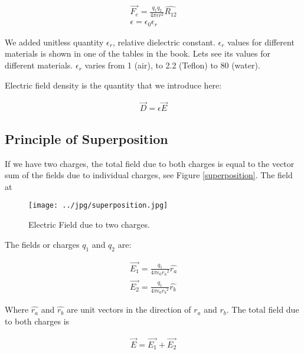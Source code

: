 \begin{eqnarray}
\vec{F_e}=\frac{q_1 q_2}{4 \pi \epsilon r^2} \hat{R_{12}} \\
\epsilon = \epsilon_0 \epsilon_r
\end{eqnarray}\label{Coulombslaw3}

We added unitless quantity $\epsilon_r$, relative dielectric constant. $\epsilon_r$ values for different materials is shown in one of the tables in the book. Lets see its values for different materials. $\epsilon_r$ varies from 1 (air), to 2.2 (Teflon) to 80 (water). 

Electric field density is the quantity that we introduce here:

\begin{eqnarray}
\vec{D}= \epsilon \vec{E}
\end{eqnarray}


\subsection{Principle of Superposition}

If we have two charges, the total field due to both charges is equal to the vector sum of the fields due to individual charges, see Figure \ref{superposition}.  The field at



\begin{figure}[htbp]
\begin{center}
\texttt{[image: ../jpg/superposition.jpg]}
\end{center}
\caption{Electric Field due to two charges.}
\label{UnitCh}
\end{figure}

The fields or charges $q_1$ and $q_2$ are:

\begin{eqnarray}
\vec{E_1}=\frac{q_1}{4 \pi \epsilon_{0} {r_a}^2} \hat{r_a} \label{field}\\
\vec{E_2}=\frac{q_1}{4 \pi \epsilon_{0} {r_b}^2} \hat{r_b}
\end{eqnarray}

Where $\hat{r_a}$ and $\hat{r_b}$ are unit vectors in the direction of $r_a$ and $r_b$. The total field due to both charges is


\begin{eqnarray}
\vec{E}=\vec{E_1} + \vec{E_2} 
\end{eqnarray}






